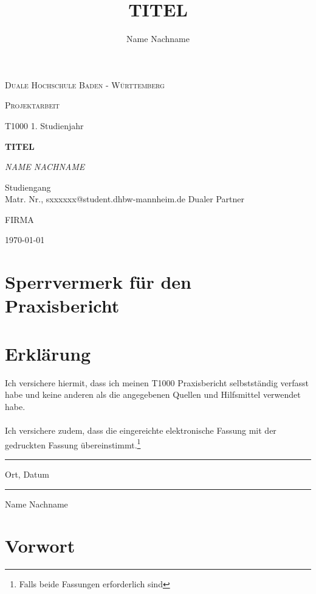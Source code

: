 \documentclass[12px, a4paper]{article}
\title{TITEL}
\author{Name Nachname}
\begin{document}
\begin{titlepage}

	\centering
	{\scshape\LARGE Duale Hochschule Baden - Württemberg \par}
	\vspace{1cm}
	{\scshape\Large Projektarbeit \par T1000 1. Studienjahr \par}
	\vspace{1.5cm}
	{\huge\bfseries TITEL\par}
	\vspace{2cm}
	{\Large\itshape NAME NACHNAME\par}
	Studiengang\\
	Matr. Nr., sxxxxxx@student.dhbw-mannheim.de
	\vfill
	Dualer Partner\par
	FIRMA \par
	

	\vfill

	{\large \today\par}
\end{titlepage}

\thispagestyle{empty}
\section*{Sperrvermerk für den Praxisbericht}
\blindtext
\vspace{2cm}
\section*{Erklärung}
Ich versichere hiermit, dass ich meinen T1000 Praxisbericht selbstständig verfasst habe und keine anderen als die angegebenen Quellen und Hilfsmittel verwendet habe. \\
\\ 
Ich versichere zudem, dass die eingereichte elektronische Fassung mit der gedruckten Fassung übereinstimmt.\footnote{Falls beide Fassungen erforderlich sind} \\
\vspace{2cm}

\parbox{5cm}{\centering \hrule
\strut \centering\footnotesize Ort, Datum} \hfill\parbox{5cm}{\hrule
\strut \centering\footnotesize Name Nachname}
\vspace{2 cm}
\section*{Vorwort}
\blindtext
\end{document}
